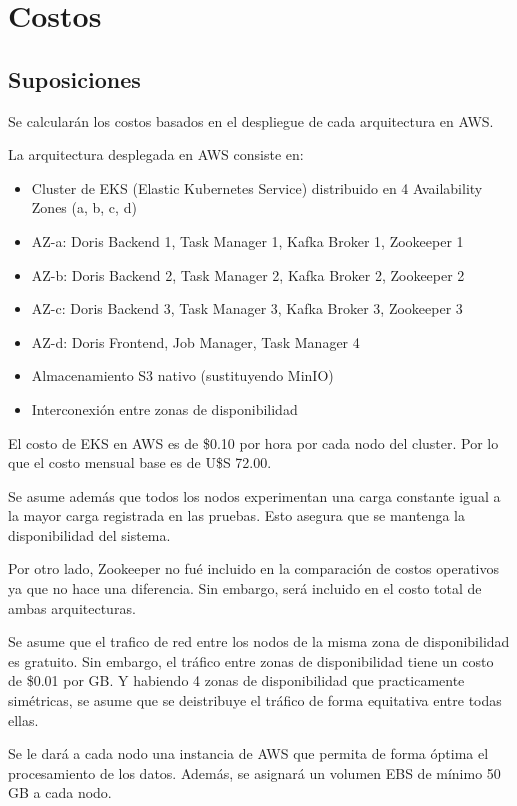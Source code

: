 \section{Costos}

\subsection{Suposiciones}
Se calcularán los costos basados en el despliegue de cada arquitectura en AWS.

La arquitectura desplegada en AWS consiste en:

\begin{itemize}
    \item Cluster de EKS (Elastic Kubernetes Service) distribuido en 4 Availability Zones (a, b, c, d)
    \item AZ-a: Doris Backend 1, Task Manager 1, Kafka Broker 1, Zookeeper 1
    \item AZ-b: Doris Backend 2, Task Manager 2, Kafka Broker 2, Zookeeper 2
    \item AZ-c: Doris Backend 3, Task Manager 3, Kafka Broker 3, Zookeeper 3
    \item AZ-d: Doris Frontend, Job Manager, Task Manager 4
    \item Almacenamiento S3 nativo (sustituyendo MinIO)
    \item Interconexión entre zonas de disponibilidad
\end{itemize}

El costo de EKS en AWS es de \$0.10 por hora por cada nodo del cluster.
Por lo que el costo mensual base es de U\$S 72.00.

Se asume además que todos los nodos experimentan una carga constante igual a la mayor carga registrada en las pruebas. 
Esto asegura que se mantenga la disponibilidad del sistema.

Por otro lado, Zookeeper no fué incluido en la comparación de costos operativos ya que no hace una diferencia. 
Sin embargo, será incluido en el costo total de ambas arquitecturas.

Se asume que el trafico de red entre los nodos de la misma zona de disponibilidad es gratuito. 
Sin embargo, el tráfico entre zonas de disponibilidad tiene un costo de \$0.01 por GB.
Y habiendo 4 zonas de disponibilidad que practicamente simétricas, se asume que se deistribuye el tráfico de forma equitativa entre todas ellas.

Se le dará a cada nodo una instancia de AWS que permita de forma óptima el procesamiento de los datos. 
Además, se asignará un volumen EBS de mínimo 50 GB a cada nodo.

